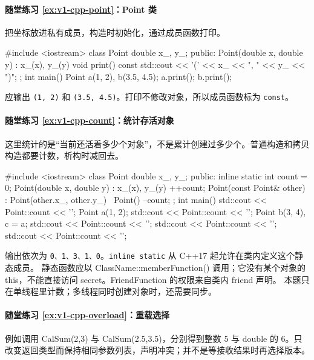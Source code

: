 \paragraph*{随堂练习 \ref{ex:v1-cpp-point}：Point 类}
\begin{solution}
把坐标放进私有成员，构造时初始化，通过成员函数打印。
\begin{tcpp}
#include <iostream>
class Point {
    double x_, y_;
public:
    Point(double x, double y) : x_(x), y_(y) {}
    void print() const {
        std::cout << '(' << x_ << ", " << y_ << ")\n";
    }
};
int main() {
    Point a(1, 2), b(3.5, 4.5);
    a.print();
    b.print();
}
\end{tcpp}
应输出 \texttt{(1, 2)} 和 \texttt{(3.5, 4.5)}。打印不修改对象，所以成员函数标为 \texttt{const}。
\end{solution}

\paragraph*{随堂练习 \ref{ex:v1-cpp-count}：统计存活对象}
\begin{solution}
这里统计的是“当前还活着多少个对象”，不是累计创建过多少个。普通构造和拷贝构造都要计数，析构时减回去。
\begin{tcpp}
#include <iostream>
class Point {
    double x_, y_;
public:
    inline static int count = 0;
    Point(double x, double y) : x_(x), y_(y) { ++count; }
    Point(const Point& other) : Point(other.x_, other.y_) {}
    ~Point() { --count; }
};
int main() {
    std::cout << Point::count << '\n';
    {
        Point a(1, 2);
        std::cout << Point::count << '\n';
        {
            Point b(3, 4), c = a;
            std::cout << Point::count << '\n';
        }
        std::cout << Point::count << '\n';
    }
    std::cout << Point::count << '\n';
}
\end{tcpp}
输出依次为 \texttt{0、1、3、1、0}。\texttt{inline static} 从 C++17 起允许在类内定义这个静态成员。
静态函数应以 ClassName::memberFunction() 调用；它没有某个对象的 this，不能直接访问 secret。FriendFunction 的权限来自类内 friend 声明。
本题只在单线程里计数；多线程同时创建对象时，还需要同步。
\end{solution}

\paragraph*{随堂练习 \ref{ex:v1-cpp-overload}：重载选择}
\begin{solution}
例如调用 CalSum(2,3) 与 CalSum(2.5,3.5)，分别得到整数 5 与 double 的 6。只改变返回类型而保持相同参数列表，声明冲突；并不是等接收结果时再选择版本。
\end{solution}
